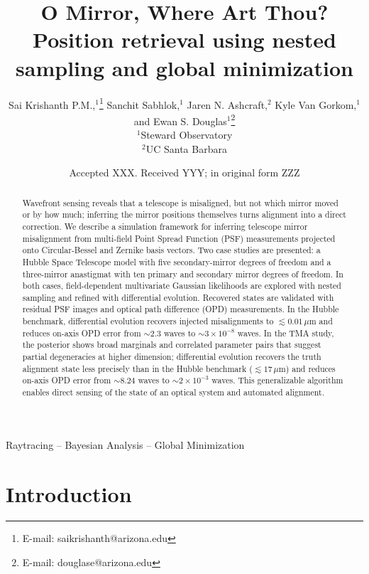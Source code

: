 \documentclass[fleqn,usenatbib]{rasti}
\title[O Mirror, Where Art Thou?]{O Mirror, Where Art Thou? \\
  \large Position retrieval using nested sampling and global minimization}
\author[Sai Krishanth P.M. et al.]{
Sai Krishanth P.M.,$^{1}$\thanks{E-mail: saikrishanth@arizona.edu}
Sanchit Sabhlok,$^{1}$
Jaren N. Ashcraft,$^{2}$
Kyle Van Gorkom,$^{1}$
and Ewan S. Douglas$^{1}$\thanks{E-mail: douglase@arizona.edu}
\\
$^{1}$Steward Observatory\\
$^{2}$UC Santa Barbara
}
\date{Accepted XXX. Received YYY; in original form ZZZ}
\begin{document}
\label{firstpage}
\pagerange{\pageref{firstpage}--\pageref{lastpage}}
\maketitle

\begin{abstract}
Wavefront sensing reveals that a telescope is misaligned, but not which mirror moved or by how much; inferring the mirror positions themselves turns alignment into a direct correction. We describe a simulation framework for inferring telescope mirror misalignment from multi-field Point Spread Function (PSF) measurements projected onto Circular-Bessel and Zernike basis vectors. Two case studies are presented: a Hubble Space Telescope model with five secondary-mirror degrees of freedom and a three-mirror anastigmat with ten primary and secondary mirror degrees of freedom. In both cases, field-dependent multivariate Gaussian likelihoods are explored with nested sampling and refined with differential evolution. Recovered states are validated with residual PSF images and optical path difference (OPD) measurements. In the Hubble benchmark, differential evolution recovers injected misalignments to $\lesssim 0.01\,\mu\mathrm{m}$ and reduces on-axis OPD error from $\sim 2.3$ waves to $\sim 3\times 10^{-8}$ waves. In the TMA study, the posterior shows broad marginals and correlated parameter pairs that suggest partial degeneracies at higher dimension; differential evolution recovers the truth alignment state less precisely than in the Hubble benchmark ($\lesssim 17\,\mu\mathrm{m}$) and reduces on-axis OPD error from $\sim 8.24$ waves to $\sim 2\times 10^{-3}$ waves. This generalizable algorithm enables direct sensing of the state of an optical system and automated alignment.
\end{abstract}

\begin{keywords}
Raytracing -- Bayesian Analysis -- Global Minimization
\end{keywords}



\section{Introduction}\label{sec:intro}
\end{document}
